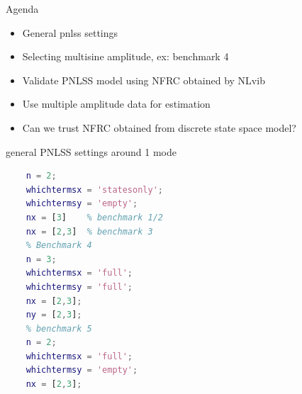 \documentclass[9pt]{beamer}
\begin{document}
\begin{frame}
  \begin{center}
   Agenda
 \end{center}
 \begin{itemize}
 \item General pnlss settings
 \item Selecting multisine amplitude, ex: benchmark 4
 \item Validate PNLSS model using NFRC obtained by NLvib
 \item Use multiple amplitude data for estimation
 \item Can we trust NFRC obtained from discrete state space model?
 \end{itemize}
\end{frame}


\begin{frame}[fragile]{general PNLSS settings around 1 mode}
\begin{lstlisting}[language=matlab]
    % benchmark 1-3
    n = 2;
    whichtermsx = 'statesonly';
    whichtermsy = 'empty';
    nx = [3]    % benchmark 1/2
    nx = [2,3]  % benchmark 3
    % Benchmark 4
    n = 3;
    whichtermsx = 'full';
    whichtermsy = 'full';
    nx = [2,3];
    ny = [2,3];
    % benchmark 5
    n = 2;
    whichtermsx = 'full';
    whichtermsy = 'empty';
    nx = [2,3];
\end{lstlisting}

\end{frame}
\end{document}
